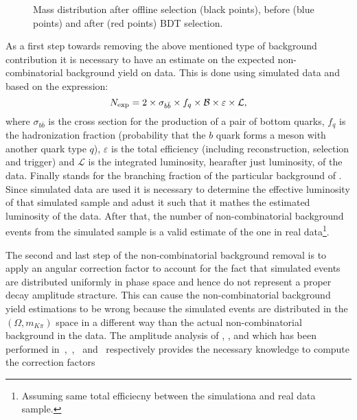 \begin{figure}[!t]
  \centering
  \scalebox{1}{}
  \caption{Mass distribution after offline selection (black points), before (blue points) and after (red points) BDT selection.}
  \label{mass_BDTG_selection}
\end{figure}

As a first step towards removing the above mentioned type of background contribution it is necessary to have an estimate
on the expected non-combinatorial background yield on data. This is done using simulated data and based on the expression:
\begin{equation}
N_{\rm exp} = 2 \times \sigma_{b\bar{b}}\times f_q \times {\ensuremath{\cal B}} \times \varepsilon \times {\mathcal{L}},
\end{equation}
\noindent where $\sigma_{b\bar{b}}$ is the cross section for the production of a pair of bottom quarks, $f_q$ is the hadronization fraction
(probability that the $b$ quark forms a meson with another quark type $q$), $\varepsilon$ is the total efficiency (including reconstruction,
selection and trigger) and ${\mathcal{L}}$ is the integrated luminosity, hearafter just luminosity, of the data. Finally \BR stands for the
branching fraction of the particular background of . Since simulated data are used it is necessary to determine
the effective luminosity of that simulated sample and adust it such that it mathes the estimated luminosity of the data. After that, the
number of non-combinatorial background events from the simulated sample is a valid estimate of the one in real
data\footnote{Assuming same total efficiecny between the simulationa and real data sample.}.

The second and last step of the non-combinatorial background removal is to apply an angular correction factor to account for the fact that
simulated events are distributed uniformly in phase space and hence do not represent a proper decay amplitude stracture.
This can cause the non-combinatorial background yield estimations to be wrong because the simulated events are distributed in the $(\Omega, m_{K\pi})$ space
in a different way than the actual non-combinatorial background in the data. The amplitude analysis of \BdJpsipipi, \BsJpsipipi, \BsJpsiKK and \LbJpsipK
which has been performed in~\cite{SheldonBdpipi},~\cite{SheldonBspipi},~\cite{SheldonKK} and~\cite{Gao:1701984} respectively provides
the necessary knowledge to compute the correction factors

